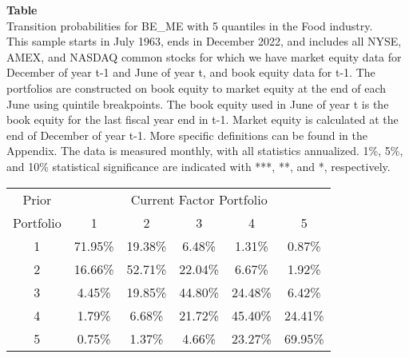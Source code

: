 \begin{table*}[ht!]
\raggedright
{}
\label{tab: transition_probs_BE_ME_Food_with_5_quantiles}
\textbf{Table \thetable} \\
Transition probabilities for BE_ME with 5 quantiles in the Food industry. \\
\hspace*{1em}This sample starts in July 1963, ends in December 2022, and includes all NYSE, AMEX, and NASDAQ common stocks for which we have market equity data for December of year t-1 and June of year t, and book equity data for t-1. The portfolios are constructed on book equity to market equity at the end of each June using quintile breakpoints.  The book equity used in June of year t is the book equity for the last fiscal year end in t-1.  Market equity is calculated at the end of December of year t-1.  More specific definitions can be found in the Appendix.  The data is measured monthly, with all statistics annualized.  1\%, 5\%, and 10\% statistical significance are indicated with ***, **, and *, respectively. \\
\vspace{0.5em}
\centering
\begin{adjustbox}{max width=\textwidth}
\begin{tabular}{@{}cccccc@{}}
\toprule
Prior & \multicolumn{5}{c}{Current Factor Portfolio} \\
Portfolio & 1 & 2 & 3 & 4 & 5 \\
\midrule
1 & 71.95\% & 19.38\% & 6.48\% & 1.31\% & 0.87\% \\
2 & 16.66\% & 52.71\% & 22.04\% & 6.67\% & 1.92\% \\
3 & 4.45\% & 19.85\% & 44.80\% & 24.48\% & 6.42\% \\
4 & 1.79\% & 6.68\% & 21.72\% & 45.40\% & 24.41\% \\
5 & 0.75\% & 1.37\% & 4.66\% & 23.27\% & 69.95\% \\
\bottomrule
\end{tabular}
\end{adjustbox}
\end{table*}